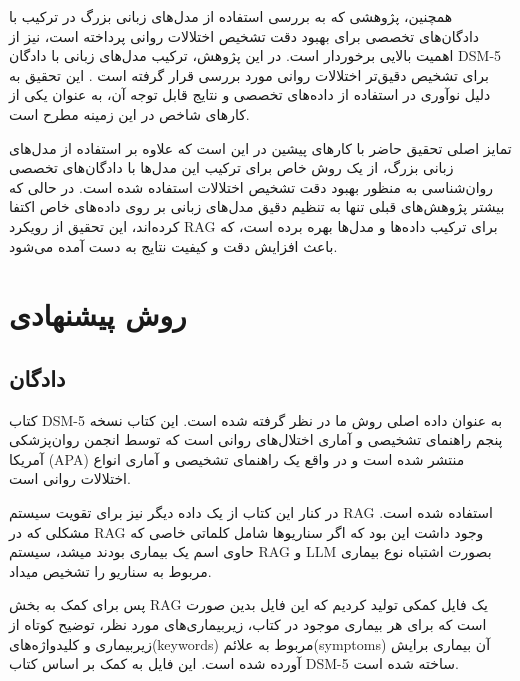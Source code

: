 \documentclass{CCI2020}
\begin{document}
همچنین، پژوهشی که به بررسی استفاده از مدل‌های زبانی بزرگ در ترکیب با دادگان‌های تخصصی برای بهبود دقت تشخیص اختلالات روانی پرداخته است، نیز از اهمیت بالایی برخوردار است. در این پژوهش، ترکیب مدل‌های زبانی با دادگان DSM-5 برای تشخیص دقیق‌تر اختلالات روانی مورد بررسی قرار گرفته است \cite{Smith2022RAG}. این تحقیق به دلیل نوآوری در استفاده از داده‌های تخصصی و نتایج قابل توجه آن، به عنوان یکی از کارهای شاخص در این زمینه مطرح است.

تمایز اصلی تحقیق حاضر با کارهای پیشین در این است که علاوه بر استفاده از مدل‌های زبانی بزرگ، از یک روش خاص برای ترکیب این مدل‌ها با دادگان‌های تخصصی روان‌شناسی به منظور بهبود دقت تشخیص اختلالات استفاده شده است. در حالی که بیشتر پژوهش‌های قبلی تنها به تنظیم دقیق مدل‌های زبانی بر روی داده‌های خاص اکتفا کرده‌اند، این تحقیق از رویکرد RAG برای ترکیب داده‌ها و مدل‌ها بهره برده است، که باعث افزایش دقت و کیفیت نتایج به دست آمده می‌شود.

\section{روش پیشنهادی}
\subsection{دادگان}
کتاب DSM-5 به عنوان داده اصلی روش ما در نظر گرفته شده است. این کتاب نسخه پنجم راهنمای تشخیصی و آماری اختلال‌های روانی است که توسط انجمن روان‌پزشکی آمریکا (APA) منتشر شده است و در واقع یک راهنمای تشخیصی و آماری انواع اختلالات روانی است.        

در کنار این کتاب از یک داده دیگر نیز برای تقویت سیستم RAG استفاده شده است. مشکلی که در RAG وجود داشت این بود که اگر سناریوها شامل کلماتی خاصی که حاوی اسم یک بیماری بودند میشد، سیستم RAG و LLM بصورت اشتباه نوع بیماری مربوط به سناریو را تشخیص میداد.         

پس برای کمک به بخش RAG یک فایل کمکی تولید کردیم که این فایل بدین صورت است که برای هر بیماری موجود در کتاب، زیربیماری‌های مورد نظر، توضیح کوتاه از زیربیماری و کلیدواژه‌های(keywords) مربوط به علائم(symptoms) آن بیماری برایش آورده شده است. این فایل به کمک  بر اساس کتاب DSM-5 ساخته شده است.
\end{document}
